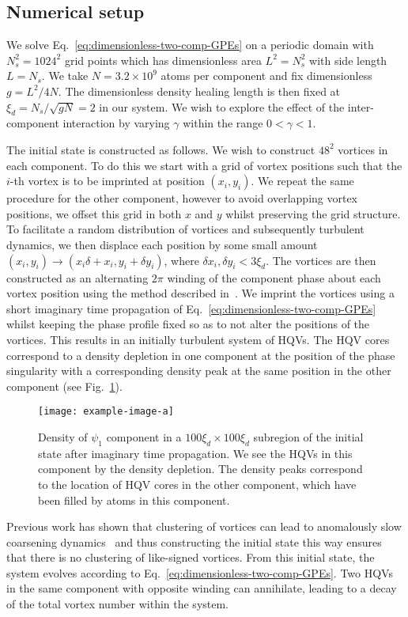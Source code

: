 \subsection{Numerical setup}
We solve Eq.~\eqref{eq:dimensionless-two-comp-GPEs} on a periodic domain with 
$N_s^2=1024^2$ grid points which has dimensionless area $L^2=N_s^2$ with side
length $L=N_s$.
We take $N=3.2\times10^9$ atoms per component and fix dimensionless $g=L^2/4N$.
The dimensionless density healing length is then fixed at
$\xi_d=N_s/\sqrt{gN}=2$ in our system.
We wish to explore the effect of the inter-component interaction by varying
$\gamma$ within the range $0 < \gamma < 1$.\par

The initial state is constructed as follows.
We wish to construct $48^2$ vortices in each component.
To do this we start with a grid of vortex positions such that the 
$i$-th vortex is to be imprinted at position $(x_i, y_i)$.
We repeat the same procedure for the other component, however to avoid
overlapping vortex positions, we offset this grid in both $x$ and $y$ whilst
preserving the grid structure.
To facilitate a random distribution of vortices and subsequently turbulent
dynamics, we then displace each position by some small amount 
$(x_i, y_i) \rightarrow (x_i \delta + x_i, y_i + \delta y_i)$, where 
$\delta x_i, \delta y_i < 3\xi_d$.
The vortices are then constructed as an alternating $2\pi$ winding of the
component phase about each vortex position using the method described
in~\cite{Billam2014}.
We imprint the vortices using a short imaginary time propagation of
Eq.~\eqref{eq:dimensionless-two-comp-GPEs} whilst keeping the phase profile
fixed so as to not alter the positions of the vortices.
This results in an initially turbulent system of HQVs.
The HQV cores correspond to a density depletion in one component at the position
of the phase singularity with a corresponding density peak at the same position
in the other component (see Fig.~\ref{fig:initial-vortex-state}).
\begin{figure}
    \centering
    \texttt{[image: example-image-a]}
    \caption{Density of $\psi_1$ component in a $100\xi_d\times100\xi_d$
    subregion of the initial state after imaginary time propagation.
    We see the HQVs in this component by the density depletion.
    The density peaks correspond to the location of HQV cores in the other
    component, which have been filled by atoms in this component.}
    \label{fig:initial-vortex-state}
\end{figure}
Previous work has shown that clustering of vortices can lead to anomalously
slow coarsening dynamics~\cite{Karl2017} and thus constructing the initial
state this way ensures that there is no clustering of like-signed vortices.
From this initial state, the system evolves according to
Eq.~\eqref{eq:dimensionless-two-comp-GPEs}.
Two HQVs in the same component with opposite winding can annihilate, leading to
a decay of the total vortex number within the system.

